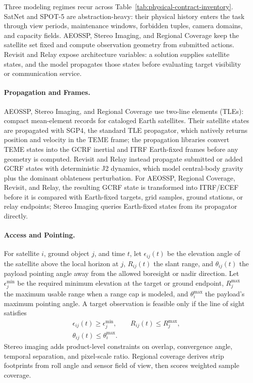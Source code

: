 \documentclass[11pt]{article}
\begin{document}
Three modeling regimes recur across Table~\ref{tab:physical-contract-inventory}. SatNet and SPOT-5 are abstraction-heavy: their physical history enters the task through view periods, maintenance windows, forbidden tuples, camera domains, and capacity fields. AEOSSP, Stereo Imaging, and Regional Coverage keep the satellite set fixed and compute observation geometry from submitted actions. Revisit and Relay expose architecture variables: a solution supplies satellite states, and the model propagates those states before evaluating target visibility or communication service.

\paragraph{Propagation and Frames.} AEOSSP, Stereo Imaging, and Regional Coverage use two-line elements (TLEs): compact mean-element records for cataloged Earth satellites. Their satellite states are propagated with SGP4, the standard TLE propagator, which natively returns position and velocity in the TEME frame; the propagation libraries convert TEME states into the GCRF inertial and ITRF Earth-fixed frames before any geometry is computed. Revisit and Relay instead propagate submitted or added GCRF states with deterministic J2 dynamics, which model central-body gravity plus the dominant oblateness perturbation. For AEOSSP, Regional Coverage, Revisit, and Relay, the resulting GCRF state is transformed into ITRF/ECEF before it is compared with Earth-fixed targets, grid samples, ground stations, or relay endpoints; Stereo Imaging queries Earth-fixed states from its propagator directly.

\paragraph{Access and Pointing.} For satellite \(i\), ground object \(j\), and time \(t\), let \(\epsilon_{ij}(t)\) be the elevation angle of the satellite above the local horizon at \(j\), \(R_{ij}(t)\) the slant range, and \(\theta_{ij}(t)\) the payload pointing angle away from the allowed boresight or nadir direction. Let \(\epsilon_j^{\min}\) be the required minimum elevation at the target or ground endpoint, \(R_j^{\max}\) the maximum usable range when a range cap is modeled, and \(\theta_i^{\max}\) the payload's maximum pointing angle. A target observation is feasible only if the line of sight satisfies
\[
  \begin{aligned}
  \epsilon_{ij}(t)\ge \epsilon_j^{\min},\qquad
  R_{ij}(t)\le R_j^{\max},\\
  \theta_{ij}(t)\le \theta_i^{\max}.
  \end{aligned}
\]
Stereo imaging adds product-level constraints on overlap, convergence angle, temporal separation, and pixel-scale ratio. Regional coverage derives strip footprints from roll angle and sensor field of view, then scores weighted sample coverage.
\end{document}
